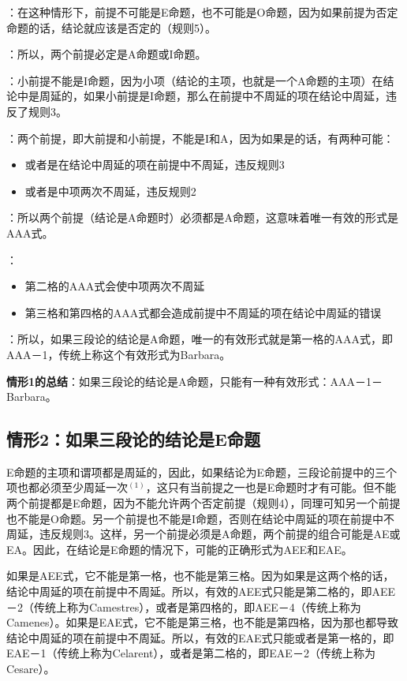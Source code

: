 \begin{examplebox}[title=情形1：如果三段论的结论是A命题]
：在这种情形下，前提不可能是E命题，也不可能是O命题，因为如果前提为否定命题的话，结论就应该是否定的（规则5）。

：所以，两个前提必定是A命题或I命题。

：小前提不能是I命题，因为小项（结论的主项，也就是一个A命题的主项）在结论中是周延的，如果小前提是I命题，那么在前提中不周延的项在结论中周延，违反了规则3。

：两个前提，即大前提和小前提，不能是I和A，因为如果是的话，有两种可能：
\begin{itemize}
  \item 或者是在结论中周延的项在前提中不周延，违反规则3
  \item 或者是中项两次不周延，违反规则2
\end{itemize}

：所以两个前提（结论是A命题时）必须都是A命题，这意味着唯一有效的形式是AAA式。

：
\begin{itemize}
  \item 第二格的AAA式会使中项两次不周延
  \item 第三格和第四格的AAA式都会造成前提中不周延的项在结论中周延的错误
\end{itemize}

：所以，如果三段论的结论是A命题，唯一的有效形式就是第一格的AAA式，即AAA－1，传统上称这个有效形式为Barbara。

\textbf{情形1的总结}：如果三段论的结论是A命题，只能有一种有效形式：AAA－1－Barbara。
\end{examplebox}

\subsection{情形2：如果三段论的结论是$\mathbf{E}$命题}
E命题的主项和谓项都是周延的，因此，如果结论为E命题，三段论前提中的三个项也都必须至少周延一次$^{(1)}$，这只有当前提之一也是E命题时才有可能。但不能两个前提都是E命题，因为不能允许两个否定前提（规则4），同理可知另一个前提也不能是O命题。另一个前提也不能是I命题，否则在结论中周延的项在前提中不周延，违反规则3。这样，另一个前提必须是A命题，两个前提的组合可能是AE或EA。因此，在结论是E命题的情况下，可能的正确形式为AEE和EAE。

如果是AEE式，它不能是第一格，也不能是第三格。因为如果是这两个格的话，结论中周延的项在前提中不周延。所以，有效的AEE式只能是第二格的，即AEE－2（传统上称为Camestres），或者是第四格的，即AEE－4（传统上称为Camenes）。如果是EAE式，它不能是第三格，也不能是第四格，因为那也都导致结论中周延的项在前提中不周延。所以，有效的EAE式只能或者是第一格的，即EAE－1（传统上称为Celarent），或者是第二格的，即EAE－2（传统上称为Cesare）。

